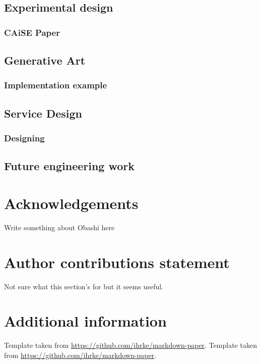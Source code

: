 \documentclass[fleqn,10pt]{wlscirep}
\begin{document}
\hypertarget{experimental-design}{%
\subsection{Experimental design}\label{experimental-design}}

\hypertarget{caise-paper}{%
\subsubsection{CAiSE Paper}\label{caise-paper}}

\hypertarget{generative-art}{%
\subsection{Generative Art}\label{generative-art}}

\hypertarget{implementation-example}{%
\subsubsection{Implementation example}\label{implementation-example}}

\hypertarget{service-design}{%
\subsection{Service Design}\label{service-design}}

\hypertarget{designing}{%
\subsubsection{Designing}\label{designing}}

\hypertarget{future-engineering-work}{%
\subsection{Future engineering work}\label{future-engineering-work}}



\section*{Acknowledgements}
Write something about Obashi here

\section*{Author contributions statement}
Not sure what this section's for but it seems useful.


\section*{Additional information}
Template taken from \url{https://github.com/ihrke/markdown-paper}.
Template taken from \url{https://github.com/ihrke/markdown-paper}.
\end{document}

